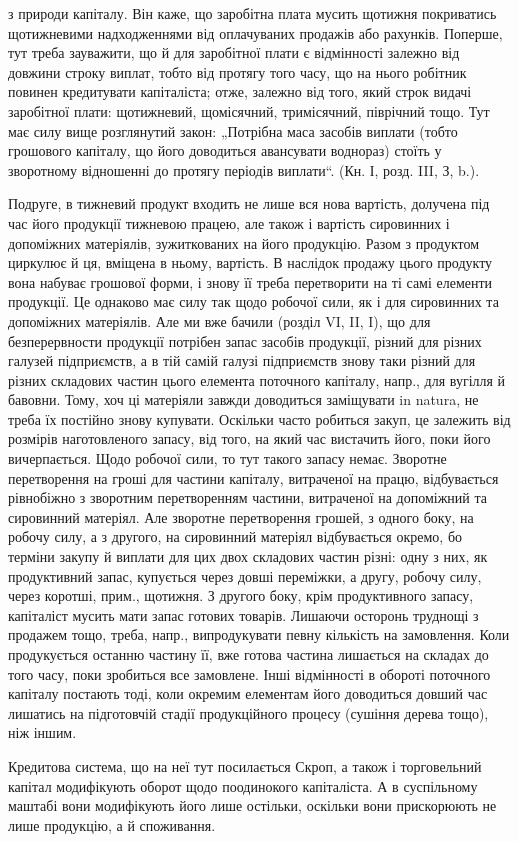 \parcont{}  %
з природи капіталу. Він каже, що заробітна плата мусить щотижня покриватись
щотижневими надходженнями від оплачуваних продажів або рахунків.
Поперше, тут треба зауважити, що й для заробітної плати є
відмінності залежно від довжини строку виплат, тобто від протягу
того часу, що на нього робітник повинен кредитувати капіталіста; отже,
залежно від того, який строк видачі заробітної плати: щотижневий,
щомісячний, тримісячний, піврічний тощо. Тут має силу вище розглянутий
закон: „Потрібна маса засобів виплати (тобто грошового капіталу, що
його доводиться авансувати воднораз) стоїть у зворотному відношенні
до протягу періодів виплати“. (Кн. І, розд. III, З, b.).

Подруге, в тижневий продукт входить не лише вся нова вартість, долучена
під час його продукції тижневою працею, але також і вартість сировинних
і допоміжних матеріялів, зужиткованих на його продукцію. Разом
з продуктом циркулює й ця, вміщена в ньому, вартість. В наслідок продажу
цього продукту вона набуває грошової форми, і знову її треба
перетворити на ті самі елементи продукції. Це однаково має силу так
щодо робочої сили, як і для сировинних та допоміжних матеріялів. Але
ми вже бачили (розділ VI, II, I), що для безперервности продукції потрібен
запас засобів продукції, різний для різних галузей підприємств,
а в тій самій галузі підприємств знову таки різний для різних складових
частин цього елемента поточного капіталу, напр., для вугілля й бавовни.
Тому, хоч ці матеріяли завжди доводиться заміщувати in natura, не треба
їх постійно знову купувати. Оскільки часто робиться закуп, це залежить
від розмірів наготовленого запасу, від того, на який час вистачить його,
поки його вичерпається. Щодо робочої сили, то тут такого запасу немає.
Зворотне перетворення на гроші для частини капіталу, витраченої на
працю, відбувається рівнобіжно з зворотним перетворенням частини, витраченої
на допоміжний та сировинний матеріял. Але зворотне перетворення
грошей, з одного боку, на робочу силу, а з другого, на сировинний
матеріял відбувається окремо, бо терміни закупу й виплати для цих двох
складових частин різні: одну з них, як продуктивний запас, купується
через довші переміжки, а другу, робочу силу, через коротші, прим.,
щотижня. З другого боку, крім продуктивного запасу, капіталіст мусить
мати запас готових товарів. Лишаючи осторонь труднощі з продажем
тощо, треба, напр., випродукувати певну кількість на замовлення. Коли
продукується останню частину її, вже готова частина лишається на складах
до того часу, поки зробиться все замовлене. Інші відмінності в обороті
поточного капіталу постають тоді, коли окремим елементам його
доводиться довший час лишатись на підготовчій стадії продукційного
процесу (сушіння дерева тощо), ніж іншим.

Кредитова система, що на неї тут посилається Скроп, а також і торговельний
капітал модифікують оборот щодо поодинокого капіталіста.
А в суспільному маштабі вони модифікують його лише остільки, оскільки
вони прискорюють не лише продукцію, а й споживання.
